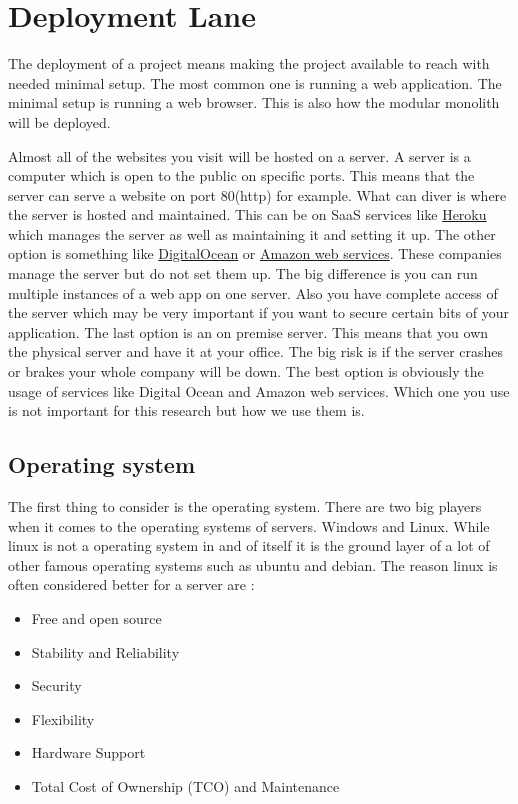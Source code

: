\chapter{Deployment Lane}

The deployment of a project means making the project available to reach with needed minimal setup. The most common one is running a web application. The minimal setup is running a web browser. This is also how the modular monolith will be deployed.

Almost all of the websites you visit will be hosted on a server. A server is a computer which is open to the public on specific ports. This means that the server can serve a website on port 80(http) for example. What can diver is where the server is hosted and maintained. This can be on SaaS services like \href{https://www.heroku.com/home}{Heroku} which manages the server as well as maintaining it and setting it up. The other option is something like \href{https://www.digitalocean.com/}{DigitalOcean} or \href{https://aws.amazon.com/}{Amazon web services}. These companies manage the server but do not set them up. The big difference is you can run multiple instances of a web app on one server. Also you have complete access of the server which may be very important if you want to secure certain bits of your application. The last option is an on premise server. This means that you own the physical server and have it at your office. The big risk is if the server crashes or brakes your whole company will be down. The best option is obviously the usage of services like Digital Ocean and Amazon web services. Which one you use is not important for this research but how we use them is.

\section{Operating system}

The first thing to consider is the operating system. There are two big players when it comes to the operating systems of servers. Windows and Linux. While linux is not a operating system in and of itself it is the ground layer of a lot of other famous operating systems such as ubuntu and debian. The reason linux is often considered better for a server are \cite{linuxBetterThanWindows}:
\begin{itemize}
  \item Free and open source
  \item Stability and Reliability
  \item Security
  \item Flexibility
  \item Hardware Support
  \item Total Cost of Ownership (TCO) and Maintenance
\end{itemize}

